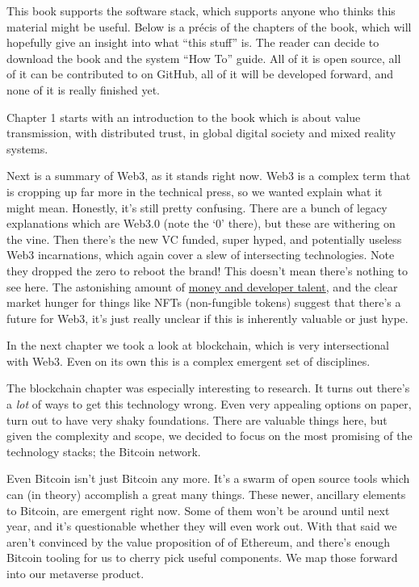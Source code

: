 This book supports the software stack, which supports anyone who thinks this material might be useful. Below is a précis of the chapters of the book, which will hopefully give an insight into what ``this stuff'' is. The reader can decide to download the book and the system ``How To'' guide. All of it is open source, all of it can be contributed to on GitHub, all of it will be developed forward, and none of it is really finished yet.\par
Chapter 1 starts with an introduction to the book which is about value transmission, with distributed trust, in global digital society and mixed reality systems. \par
Next is a summary of Web3, as it stands right now. Web3 is a complex term that is cropping up far more in the technical press, so we wanted explain what it might mean. Honestly, it’s still pretty confusing. There are a bunch of legacy explanations which are Web3.0 (note the `0' there), but these are withering on the vine. Then there’s the new VC funded, super hyped, and potentially useless Web3 incarnations, which again cover a slew of intersecting technologies. Note they dropped the zero to reboot the brand! This doesn’t mean there’s nothing to see here. The astonishing amount of \href{https://mirror.xyz/tr3butor.eth/AlZPMq_syymAoi8M1VVb2xES9Twj1OeetJbEE7EWhiw}{money and developer talent}, and the clear market hunger for things like NFTs (non-fungible tokens) suggest that there’s a future for Web3, it’s just really unclear if this is inherently valuable or just hype.\par
In the next chapter we took a look at blockchain, which is very intersectional with Web3. Even on its own this is a complex emergent set of disciplines. \par
The blockchain chapter was especially interesting to research. It turns out there’s a \textit{lot} of ways to get this technology wrong. Even very appealing options on paper, turn out to have very shaky foundations. There are valuable things here, but given the complexity and scope, we decided to focus on the most promising of the technology stacks; the Bitcoin network.\par
Even Bitcoin isn’t just Bitcoin any more. It’s a swarm of open source tools which can (in theory) accomplish a great many things. These newer, ancillary elements to Bitcoin, are emergent right now. Some of them won’t be around until next year, and it’s questionable whether they will even work out. With that said we aren't convinced by the value proposition of of Ethereum, and there’s enough Bitcoin tooling for us to cherry pick useful components. We map those forward into our metaverse product.\par
